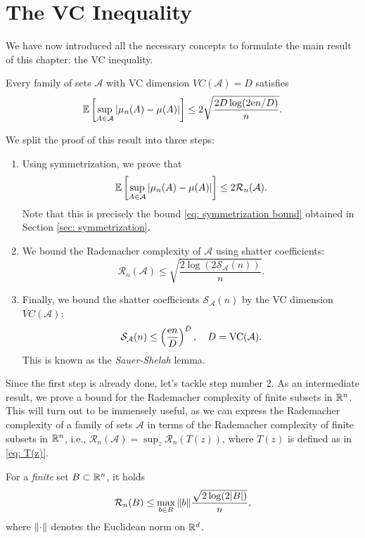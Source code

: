 \section{The VC Inequality}
\label{sec: VC inequality}

We have now introduced all the necessary concepts to formulate the main result of this chapter: the VC inequality.

\begin{theorem}[VC Inequality]
Every family of sets $\mathcal{A}$ with VC dimension $VC(\mathcal{A}) = D$ satisfies
\[
    \mathbb{E}\left[ \sup_{A \in \mathcal{A}} \abs{\mu_n(A) - \mu(A)} \right] \leq 2 \sqrt{\frac{2D \log(2 \mathrm{e} n / D)}{n}}.
\]
\end{theorem}

We split the proof of this result into three steps:

\begin{enumerate}
    \item Using symmetrization, we prove that
    \[
        \mathbb{E}\left[ \sup_{A \in \mathcal{A}} \abs{\mu_n(A) - \mu(A)} \right] \leq 2 \mathcal{R}_n(\mathcal{A}).
    \]
    Note that this is precisely the bound \eqref{eq: symmetrization bound} obtained in Section \ref{sec: symmetrization}.

    \item We bound the Rademacher complexity of $\mathcal{A}$ using shatter coefficients:
    \[
        \mathcal{R}_n(\mathcal{A}) \leq \sqrt{ \frac{2 \log(2 \mathcal{S}_{\mathcal{A}}(n)) }{n} }.
    \]

    \item Finally, we bound the shatter coefficients $\mathcal{S}_{\mathcal{A}}(n)$ by the VC dimension $VC(\mathcal{A})$:
    \[
        \mathcal{S}_{\mathcal{A}}(n) \leq \left( \frac{\mathrm{e} n}{D} \right)^D, \quad D = \mathrm{VC}(\mathcal{A}).
    \]
    This is known as the \emph{Sauer-Shelah} lemma.
\end{enumerate}

Since the first step is already done, let's tackle step number 2. As an intermediate result, we prove a bound for the Rademacher complexity of finite subsets in $\mathbb{R}^n$. This will turn out to be immensely useful, as we can express the Rademacher complexity of a family of sets $\mathcal{A}$ in terms of the Rademacher complexity of finite subsets in $\mathbb{R}^n$, i.e., $\mathcal{R}_n(\mathcal{A}) = \sup_z \mathcal{R}_n(T(z))$, where $T(z)$ is defined as in \eqref{eq: T(z)}.

\begin{lemma}
\label{lem: bound on rademacher complexity of finite set}
For a \emph{finite} set $B \subset \mathbb{R}^n$, it holds
\[
    \mathcal{R}_n(B) \leq \max_{b \in B} \norm{b} \frac{\sqrt{2 \log(2 \abs{B})}}{n},
\]
where $\norm{\cdot}$ denotes the Euclidean norm on $\mathbb{R}^d$.
\end{lemma}

